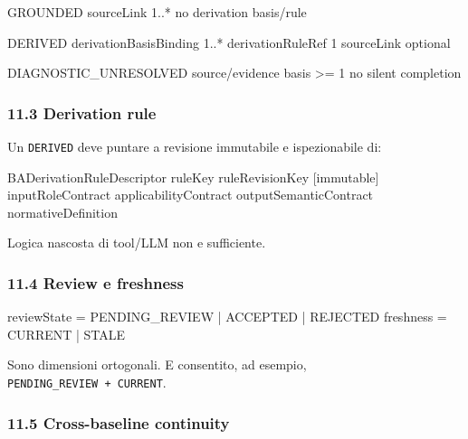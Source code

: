 \documentclass[
  9pt,
  a4paper,
]{article}
\newenvironment{Shaded}{}{}
\newcommand{\NormalTok}[1]{#1}
\begin{document}
\begin{Shaded}
\begin{Highlighting}[]
\NormalTok{GROUNDED}
\NormalTok{  sourceLink 1..*}
\NormalTok{  no derivation basis/rule}

\NormalTok{DERIVED}
\NormalTok{  derivationBasisBinding 1..*}
\NormalTok{  derivationRuleRef 1}
\NormalTok{  sourceLink optional}

\NormalTok{DIAGNOSTIC\_UNRESOLVED}
\NormalTok{  source/evidence basis \textgreater{}= 1}
\NormalTok{  no silent completion}
\end{Highlighting}
\end{Shaded}

\subsubsection{11.3 Derivation rule}\label{derivation-rule}

Un \texttt{DERIVED} deve puntare a revisione immutabile e ispezionabile
di:

\begin{Shaded}
\begin{Highlighting}[]
\NormalTok{BADerivationRuleDescriptor}
\NormalTok{  ruleKey}
\NormalTok{  ruleRevisionKey [immutable]}
\NormalTok{  inputRoleContract}
\NormalTok{  applicabilityContract}
\NormalTok{  outputSemanticContract}
\NormalTok{  normativeDefinition}
\end{Highlighting}
\end{Shaded}

Logica nascosta di tool/LLM non e sufficiente.

\subsubsection{11.4 Review e freshness}\label{review-e-freshness}

\begin{Shaded}
\begin{Highlighting}[]
\NormalTok{reviewState = PENDING\_REVIEW | ACCEPTED | REJECTED}
\NormalTok{freshness   = CURRENT | STALE}
\end{Highlighting}
\end{Shaded}

Sono dimensioni ortogonali. E consentito, ad esempio,
\texttt{PENDING\_REVIEW\ +\ CURRENT}.

\subsubsection{11.5 Cross-baseline
continuity}\label{cross-baseline-continuity}
\end{document}
